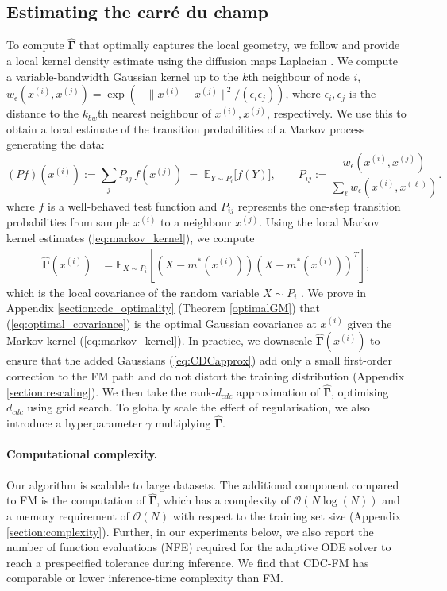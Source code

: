 \documentclass{article} %
\newcommand{\E}{\mathbb{E}}
\newcommand{\G}{\widehat{\mathbf{\Gamma}}}
\begin{document}
\subsection{Estimating the carr\'{e} du champ}\label{section:CDC}

To compute $\G$ that optimally captures the local geometry, we follow \cite{jones2024diffusion, jones2024manifold, jones2026computing} and provide a local kernel density estimate using the diffusion maps Laplacian \citep{COIFMAN20065, berry2016variable}. We compute a variable-bandwidth Gaussian kernel up to the $k$th neighbour of node $i$, $w_\epsilon(x^{(i)},x^{(j)}) = \exp\!\left(-\|x^{(i)}-x^{(j)}\|^2/(\epsilon_i\epsilon_j)\right)$, where  $\epsilon_i,\epsilon_j$ is the distance to the $k_{bw}$th nearest neighbour of $x^{(i)},x^{(j)}$, respectively.
We use this to obtain a local estimate of the transition probabilities of a Markov process generating the data:
%
\begin{equation}\label{eq:markov_kernel}
    (Pf)(x^{(i)}) := \sum_j P_{ij}\,f(x^{(j)}) \;=\; \E_{Y\sim P_i}\!\big[f(Y)\big],
\qquad P_{ij} := \frac{w_\epsilon(x^{(i)},x^{(j)})}{\sum_\ell w_\epsilon(x^{(i)},x^{(\ell)})}.
\end{equation}
%
where $f$ is a well-behaved test function and $P_{ij}$ represents the one-step transition probabilities from sample $x^{(i)}$ to a neighbour $x^{(j)}$.
Using the local Markov kernel estimates (\ref{eq:markov_kernel}), we compute
%
\begin{align}\label{eq:optimal_covariance}
    \G(x^{(i)}) 
    &= \E_{X\sim P_i}\left[ \left(X - m^*(x^{(i)})\right)\left(X - m^*(x^{(i)})\right)^T \right],
\end{align}
%
which is the local covariance of the random variable $X\sim P_i$ \citep{bakry2014analysis}. 
We prove in Appendix \ref{section:cdc_optimality} (Theorem \ref{optimalGM}) that (\ref{eq:optimal_covariance}) is the optimal Gaussian covariance at $x^{(i)}$ given the Markov kernel (\ref{eq:markov_kernel}). 
In practice, we downscale $\G(x^{(i)})$ to ensure that the added Gaussians (\ref{eq:CDCapprox}) add only a small first-order correction to the FM path and do not distort the training distribution (Appendix \ref{section:rescaling}).
We then take the rank-$d_{cdc}$ approximation of $\G$, optimising $d_{cdc}$ using grid search.
To globally scale the effect of regularisation, we also introduce a hyperparameter $\gamma$ multiplying $\G$. 

\paragraph{Computational complexity.} Our algorithm is scalable to large datasets. The additional component compared to FM is the computation of $\G$, which has a complexity of $\mathcal{O}\!\left(N\log(N)\right)$ and a memory requirement of $\mathcal{O}(N)$ with respect to the training set size (Appendix \ref{section:complexity}).
Further, in our experiments below, we also report the number of function evaluations (NFE) required for the adaptive ODE solver to reach a prespecified tolerance during inference. 
We find that CDC-FM has comparable or lower inference-time complexity than FM.
\end{document}
